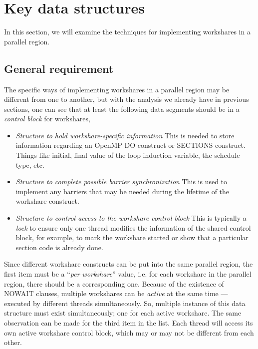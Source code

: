 
\section{Key data structures}
\label{design}

In this section, we will examine the techniques for implementing
workshares in a parallel region. 

 
\subsection{General requirement}
\label{sec:require}

The specific ways of implementing workshares in a parallel region may
be different from one to another, but with the analysis we already
have in previous sections, one can see that at least the following
data segments should be in a \emph{control block} for workshares,

\begin{itemize}
\item \emph{Structure to hold workshare-specific information} This is
  needed to store information regarding an OpenMP DO construct or
  SECTIONS construct. Things like initial, final value of the loop
  induction variable, the schedule type, etc.
\item \emph{Structure to complete possible barrier synchronization}
  This is used to implement any barriers that may be needed during the
  lifetime of the workshare construct.
\item \emph{Structure to control access to the workshare control
    block} This is typically a \emph{lock} to ensure only one thread
  modifies the information of the shared control block, for example,
  to mark the workshare started or show that a particular section code is
  already done.
\end{itemize}

Since different workshare constructs can be put into the same parallel
region, the first item must be a ``\emph{per workshare}'' value, i.e.
for each workshare in the parallel region, there should be a
corresponding one. Because of the existence of NOWAIT clauses,
multiple workshares can be \emph{active} at the same time --- executed
by different threads simultaneously.  So, multiple instance of this
data structure must exist simultaneously; one for each active
workshare. The same observation can be made for the third item in the
list. Each thread will access its own active workshare control block,
which may or may not be different from each other.

